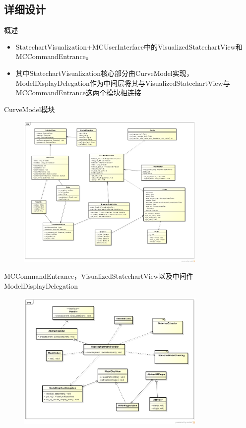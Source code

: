 \documentclass{beamer}
\begin{document}
\subsection{详细设计}
\begin{frame}{概述}
  \begin{itemize}
  \item StatechartVisualization+MCUserInterface中的VisualizedStatechartView和MCCommandEntrance。 \pause
  \item 其中StatechartVisualization核心部分由CurveModel实现，ModelDisplayDelegation作为中间层将其与VisualizedStatechartView与MCCommandEntrance这两个模块相连接 \pause
  \end{itemize}
\end{frame}
\begin{frame}{CurveModel模块}
  \begin{figure}[H]
  \includegraphics[width=3.6in]{img/5.PNG}
  \end{figure}
\end{frame}
\begin{frame}{MCCommandEntrance，VisualizedStatechartView以及中间件ModelDisplayDelegation}
  \begin{figure}[H]
  \includegraphics[width=3.6in]{img/6.PNG}
  \end{figure}
\end{frame}
\end{document}
